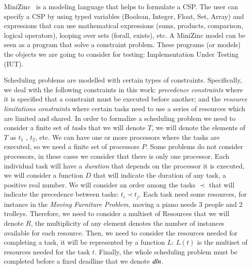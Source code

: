 MiniZinc~\cite{DBLP:journals/constraints/MarriottNRSBW08} is a modeling
language that helps to formulate a CSP. The user can specify a CSP by
using typed variables (Boolean, Integer, Float, Set, Array) and
expressions that can use mathematical expressions (sums, products,
comparison, logical operators), looping over sets (forall, exists), etc.
A MiniZinc model can be seen as a program that solve a constraint
problem. These programs (or models) the objects we are going to
consider for testing: Implementation Under Testing (IUT).

Scheduling problems are modelled with certain types of constraints.
Specifically, we deal with the following constraints in this work:
\textit{precedence constraints} where it is specified that a constraint
must be executed before another; and the \textit{resource
  limitations constraints} where certain tasks need to use a series of
resources which are limited and shared. In order to formalize a
scheduling problem we need to consider a finite set of \emph{tasks} that we will
denote $T$, we will denote the elements of $T$ as $t_{1}$ , $t_{2}$,
etc.
We can have one or more processors where the tasks are executed, so we
need a finite set of processors $P$. Some problems do not consider
processors, in these cases we consider that there is only one processor.
Each individual task will have a \emph{duration} that depends on the
processor it is executed, we will
consider a function $D$ that will indicate the duration of any task, a
positive real number.
We will consider an order among the tasks $\prec$ that
will indicate the precedence between tasks: $t_{i}\prec t_{j}$.
Each task need some resources, for instance in the \emph{Moving
  Furniture Problem}, moving a piano needs
3 people and 2 trolleys. Therefore, we need to consider a multiset of
Resources that we will denote $R$,
the multiplicity of any element denotes the number of
instances available for each resource. Then, we need to consider the
resources needed for completing a task, it will be represented by a
function $L$: $L(t)$ is the multiset of resources needed for the task
$t$. Finally, the whole scheduling problem must be completed before a
fixed deadline that we denote $\mathit{dln}$.

